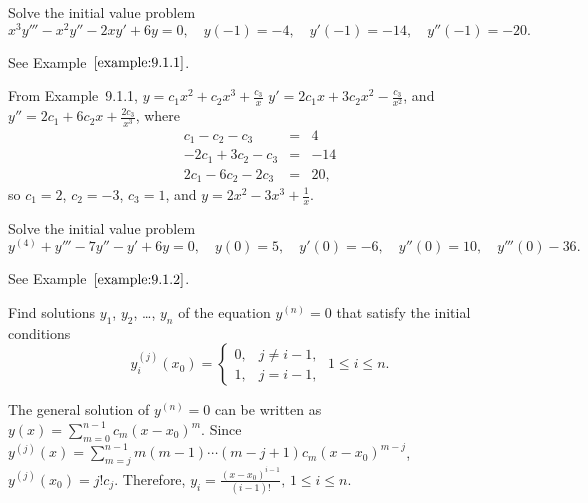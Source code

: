 \documentclass{ximera}
\begin{document}
\begin{problem}\label{exer:9.1.2}
Solve the initial value problem
$$
x^3y'''-x^2 y''-2xy'+6y=0,
\quad   y(-1)=-4, \quad   y'(-1)=-14,\quad   y''(-1)=-20.
$$

\begin{hint}
See Example~$\ref{example:9.1.1}$.
\end{hint}

\begin{solution}
From Example~9.1.1,
$y= c_1x^2+c_2x^3+\frac{c_3}{x}$
$y'=2c_1x+3c_2x^2-\frac{c_3}{x^2}$, and
$y''=2c_1+6c_2x+\frac{2c_3}{x^3}$, where
$$
\begin{array}{rcr}
c_1-c_2-c_3&=&4 \\
-2c_1+3c_2-c_3&=&-14 \\
2c_1-6c_2-2c_3&=&20,
\end{array}
$$
so $c_1=2$, $c_2=-3$, $c_3=1$, and
$y=2x^2-3x^3+\frac{1}{x}$.
\end{solution}
\end{problem}


\begin{problem}\label{exer:9.1.3}
Solve the initial value problem
$$
y^{(4)}+y'''-7y''-y'+6y=0,
\quad   y(0)=5,\quad   y'(0)=-6,\quad   y''(0)=10,\quad   y'''(0)-36.
$$

\begin{hint}
See Example~$\ref{example:9.1.2}$.
\end{hint}
\end{problem}

\begin{problem}\label{exer:9.1.4}
Find solutions $y_1$, $y_2$, \dots, $y_n$ of the equation $y^{(n)}=0$
that satisfy the initial conditions
$$
y_i^{(j)}(x_0)=\left\{\begin{array}{cl}
0,&j\ne i-1,\\ 
1,&j=i-1,\end{array}\right.\; 1\le i\le n.
$$

\begin{solution}
The general solution of $y^{(n)}=0$
can be written as $y(x)=\sum_{m=0}^{n-1}c_m(x-x_0)^m$. Since
$y^{(j)}(x)=\sum_{m=j}^{n-1}m(m-1)\cdots(m-j+1)c_m(x-x_0)^{m-j}$,
$y^{(j)}(x_0)=j!c_j$. Therefore,
$y_i=\frac{(x-x_0)^{i-1}}{(i-1)!},\,1\le i
\le n$.
\end{solution}
\end{problem}
\end{document}
